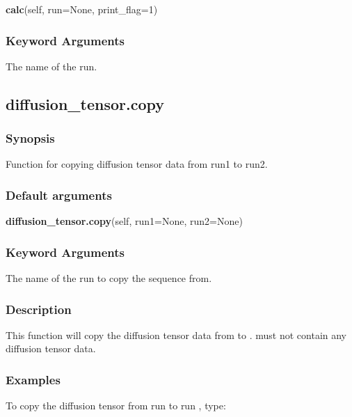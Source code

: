 \textsf{\textbf{calc}(self, run=None, print\_flag=1)}


\subsubsection{Keyword Arguments}

  The name of the run.


\newpage

\subsection{diffusion\_tensor.copy}


\subsubsection{Synopsis}

Function for copying diffusion tensor data from run1 to run2.

\subsubsection{Default arguments}

\textsf{\textbf{diffusion\_tensor.copy}(self, run1=None, run2=None)}


\subsubsection{Keyword Arguments}

  The name of the run to copy the sequence from.


\subsubsection{Description}

This function will copy the diffusion tensor data from 
 to 
.  
 must not
contain any diffusion tensor data.


\subsubsection{Examples}

To copy the diffusion tensor from run 
 to run 
, type:




